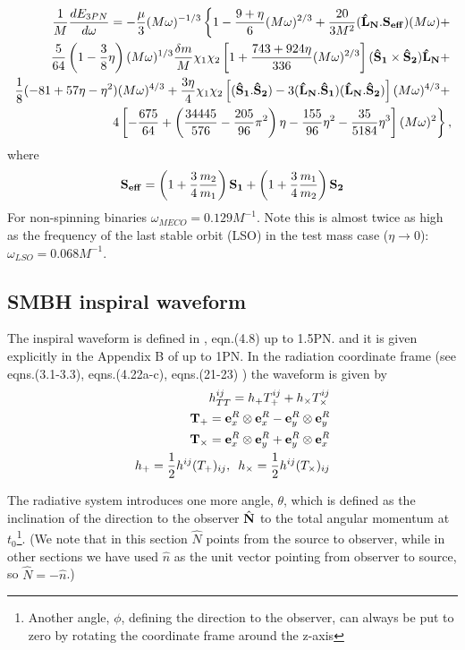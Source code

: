 \documentclass[11pt]{report}
\def\be{\begin{equation}}
\def\ee{\end{equation}}
\def\bea{\begin{eqnarray}}
\def\ena{\end{eqnarray}}
\def\bSo{{\bf \hat{S}_1}}
\def\bSt{{\bf \hat{S}_2}}
\def\bL{{\bf \hat{L}_{N}}}
\begin{document}
\bea
\frac1{M} \frac{dE_{3PN}}{d\omega} = -\frac{\mu}{3}(M\omega)^{-1/3}\left\{
1 - \frac{9+\eta}{6}(M\omega)^{2/3} + \frac{20}{3M^2}(\bL.{\bf S_{eff}})(M\omega)+
\right. \nonumber\\
\left. \frac5{64}\left( 1 - \frac3{8}\eta\right) (M\omega)^{1/3} \frac{\delta m}{M}
\chi_1\chi_2\left[ 1 + \frac{743 + 924\eta}{336}(M\omega)^{2/3}\right]
(\bSo\times\bSt)\bL +\right. \nonumber \\
\left. \frac{1}{8}(-81 + 57\eta -\eta^2)(M\omega)^{4/3} + \frac{3\eta}{4}
\chi_1\chi_2 \left[ (\bSo.\bSt) - 3(\bL.\bSo)(\bL.\bSt) \right](M\omega)^{4/3} +
\right. \nonumber \\
\left. 4\left[ -\frac{675}{64} + \left( \frac{34445}{576} - \frac{205}{96}\pi^2
\right)\eta -\frac{155}{96}\eta^2 - \frac{35}{5184}\eta^3 \right](M\omega)^{2}
\right\},
\ena 
where 
\be
{\bf S_{eff}} = \left( 1 + \frac3{4}\frac{m_2}{m_1} \right) {\bf S_1}+ 
\left( 1 + \frac3{4}\frac{m_1}{m_2} \right) {\bf S_2}
\ee
For non-spinning binaries $\omega_{MECO} = 0.129M^{-1}$.  Note this is almost twice as high
as the frequency of the last stable orbit (LSO)  
in the test mass case ($\eta \to 0$): $\omega_{LSO} = 0.068M^{-1}$.

\subsection{SMBH inspiral waveform}\label{smbh-wave}

The inspiral waveform is defined in \cite{Kidder}, eqn.(4.8) up to 
1.5PN. and it is given explicitly in the Appendix B of \cite{Kidder} 
up to 1PN. In the radiation coordinate frame (see \cite{FC} eqns.(3.1-3.3),
\cite{Kidder} eqns.(4.22a-c), \cite{BCV2} eqns.(21-23) )
the waveform is given by
\begin{eqnarray}
h_{TT}^{ij} = h_+T^{ij}_+ + h_{\times}T^{ij}_{\times}\\
{\bf T}_{+} = {\bf e}_x^R\otimes{\bf e}_x^R - {\bf e}_y^R\otimes{\bf e}_y^R\\
{\bf T}_{\times} = {\bf e}_x^R\otimes{\bf e}_y^R + {\bf e}_y^R\otimes{\bf e}_x^R\\
h_+ = \frac1{2}h^{ij}(T_+)_{ij}, \,\,\, 
h_{\times} = \frac1{2}h^{ij}(T_{\times})_{ij}
\end{eqnarray}

The radiative system introduces one more angle, $\theta$, which
is defined as the inclination of the direction to the observer $\hat{\bf N}$
to the total angular momentum at $t_0$\footnote{Another angle, $\phi$, defining 
the direction to the observer, can always
be put to zero by rotating the  coordinate frame around the z-axis}.
(We note that in this section $\hat N$ points from the source to observer, while in
other sections we have used $\hat n$ as the unit vector pointing from observer to source, so
$\hat N = - \hat n$.) 
\end{document}
